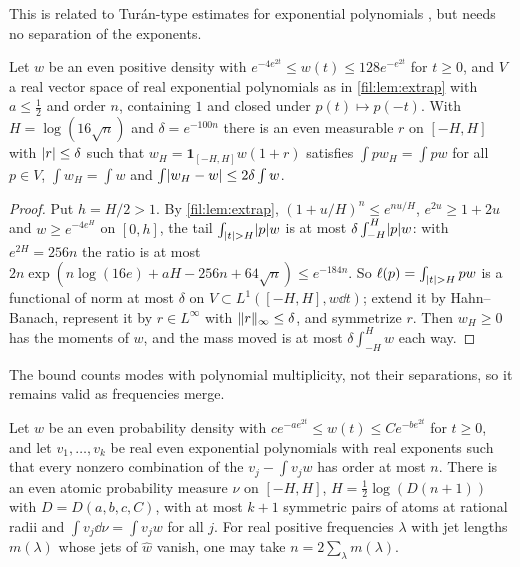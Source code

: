 This is related to Tur\'an-type estimates for exponential polynomials \cite{Nazarov1994Local}, but needs no
separation of the exponents.

\begin{theorem}\label{fil:thm:compress}
Let $w$ be an even positive density with $e^{-4e^{2t}}\le w(t)\le128e^{-e^{2t}}$ for $t\ge0$, and $V$ a real
vector space of real exponential polynomials as in \cref{fil:lem:extrap} with $a\le\tfrac12$ and order $n$,
containing $1$ and closed under $p(t)\mapsto p(-t)$. With $H=\log(16\sqrt n)$ and $\delta=e^{-100n}$ there is an
even measurable $r$ on $[-H,H]$ with $\lvert r\rvert\le\delta$ such that $w_H=\mathbf1_{[-H,H]}w(1+r)$ satisfies
$\int pw_H=\int pw$ for all $p\in V$, $\int w_H=\int w$ and $\int\lvert w_H-w\rvert\le2\delta\int w$.
\end{theorem}

\begin{proof}
Put $h=H/2>1$. By \cref{fil:lem:extrap}, $(1+u/H)^n\le e^{nu/H}$, $e^{2u}\ge1+2u$ and $w\ge e^{-4e^H}$ on $[0,h]$,
the tail $\int_{\lvert t\rvert>H}\lvert p\rvert w$ is at most $\delta\int_{-H}^H\lvert p\rvert w$: with $e^{2H}=256n$ the ratio is at most
$2n\exp(n\log(16e)+aH-256n+64\sqrt n)\le e^{-184n}$. So $\ell(p)=\int_{\lvert t\rvert>H}pw$ is a functional of norm at most
$\delta$ on $V\subset L^1([-H,H],w\dd t)$; extend it by Hahn--Banach, represent it by $r\in L^\infty$ with
$\lVert r\rVert_\infty\le\delta$, and symmetrize $r$. Then $w_H\ge0$ has the moments of $w$, and the mass moved is at most
$\delta\int_{-H}^Hw$ each way.
\end{proof}

The bound counts modes with polynomial multiplicity, not their separations, so it remains valid as
frequencies merge.

\begin{theorem}\label{fil:thm:quad}
Let $w$ be an even probability density with $ce^{-ae^{2t}}\le w(t)\le Ce^{-be^{2t}}$ for $t\ge0$, and let
$v_1,\dots,v_k$ be real even exponential polynomials with real exponents such that every nonzero combination of
the $v_j-\int v_jw$ has order at most $n$. There is an even atomic probability measure $\nu$ on $[-H,H]$,
$H=\tfrac12\log(D(n+1))$ with $D=D(a,b,c,C)$, with at most $k+1$ symmetric pairs of atoms at rational radii and
$\int v_j\dd\nu=\int v_jw$ for all $j$. For real positive frequencies $\lambda$ with jet lengths $m(\lambda)$
whose jets of $\widehat w$ vanish, one may take $n=2\sum_\lambda m(\lambda)$.
\end{theorem}

